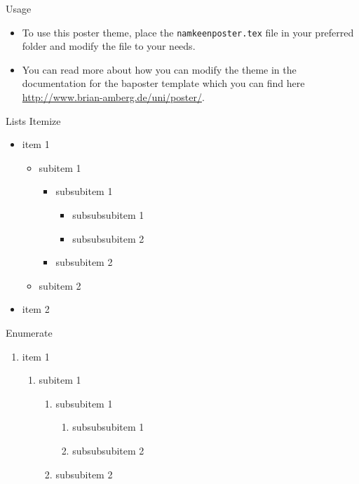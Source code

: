 \documentclass[a0paper,portrait]{baposter}
\begin{document}
\begin{poster}
\begin{posterbox}[name=usage,column=0,below=intro]{Usage}
\begin{itemize}
  \item To use this poster theme, place the {\tt namkeenposter.tex} file in your preferred folder and modify the file to your needs.
  \item You can read more about how you can modify the theme in the documentation for the baposter template which you can find here \url{http://www.brian-amberg.de/uni/poster/}.
\end{itemize}
\end{posterbox}

\begin{posterbox}[name=lists,column=0,below=usage]{Lists}
Itemize
\begin{itemize}
  \item item 1
    \begin{itemize}
      \item subitem 1
        \begin{itemize}
          \item subsubitem 1
            \begin{itemize}
              \item subsubsubitem 1
              \item subsubsubitem 2
            \end{itemize}
          \item subsubitem 2
        \end{itemize}
      \item subitem 2
    \end{itemize}
  \item item 2
\end{itemize}
Enumerate
\begin{enumerate}
  \item item 1
    \begin{enumerate}
      \item subitem 1
        \begin{enumerate}
          \item subsubitem 1
            \begin{enumerate}
              \item subsubsubitem 1
              \item subsubsubitem 2
            \end{enumerate}
          \item subsubitem 2
        \end{enumerate}

\end{enumerate}
\end{enumerate}
\end{posterbox}
\end{poster}
\end{document}
